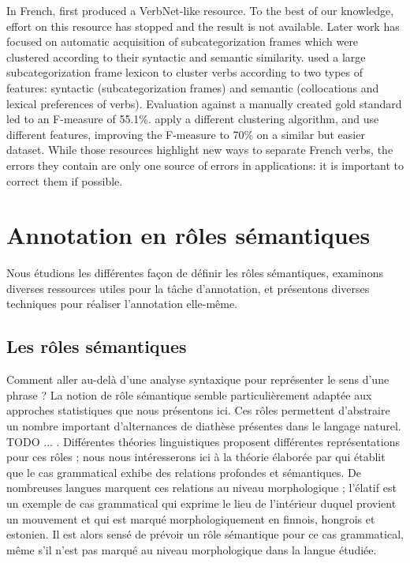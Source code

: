 In French, \cite{saintdizier1996constructing} first produced a VerbNet-like
resource. To the best of our knowledge, effort on this resource has stopped and
the result is not available. Later work has focused on automatic acquisition of
subcategorization frames which were clustered according to their syntactic and
semantic similarity. \cite{sun2010investigating} used a large
subcategorization frame lexicon \citep{messiant2010acquisition} to cluster
verbs according to two types of features: syntactic (subcategorization frames)
and semantic (collocations and lexical preferences of verbs). Evaluation
against a manually created gold standard led to an F-measure of 55.1\%.
\cite{falk2012classifying} apply a different clustering algorithm, and use
different features, improving the F-measure to 70\% on a similar but easier
dataset. While those resources highlight new ways to separate French verbs, the
errors they contain are only one source of errors in applications: it is
important to correct them if possible.



\section{Annotation en rôles sémantiques}
\label{sec:srl}

Nous étudions les différentes façon de définir les rôles sémantiques, examinons
diverses ressources utiles pour la tâche d'annotation, et présentons diverses
techniques pour réaliser l'annotation elle-même.

\subsection{Les rôles sémantiques}
\label{subsec:roles_semantiques}

Comment aller au-delà d'une analyse syntaxique pour représenter le sens d'une
phrase ? La notion de rôle sémantique semble particulièrement adaptée aux
approches statistiques que nous présentons ici. Ces rôles permettent
d'abstraire un nombre important d'alternances de diathèse présentes dans le
langage naturel. TODO ... . Différentes théories linguistiques proposent
différentes représentations pour ces rôles ; nous nous intéresserons ici à la
théorie élaborée par \cite{fillmore1968case} qui établit que le cas grammatical
exhibe des relations profondes et sémantiques. De nombreuses langues marquent
ces relations au niveau morphologique ; l'élatif est un exemple de cas
grammatical qui exprime le lieu de l'intérieur duquel provient un mouvement et
qui est marqué morphologiquement en finnois, hongrois et estonien. Il est alors
sensé de prévoir un rôle sémantique pour ce cas grammatical, même s'il n'est
pas marqué au niveau morphologique dans la langue étudiée.

